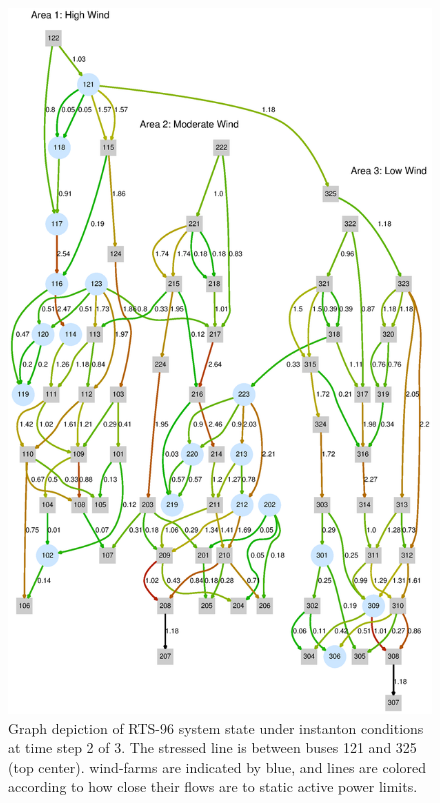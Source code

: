 \documentclass[conference]{IEEEtran}
\begin{document}

\begin{figure}[t]
\centering
\includegraphics[width=1\linewidth]{images/line118}
\caption{Graph depiction of RTS-96 system state under instanton conditions at time step 2 of 3. The stressed line is between buses 121 and 325 (top center). wind-farms are indicated by blue, and lines are colored according to how close their flows are to static active power limits.}
\label{fig:line118}
\end{figure}
\end{document}
